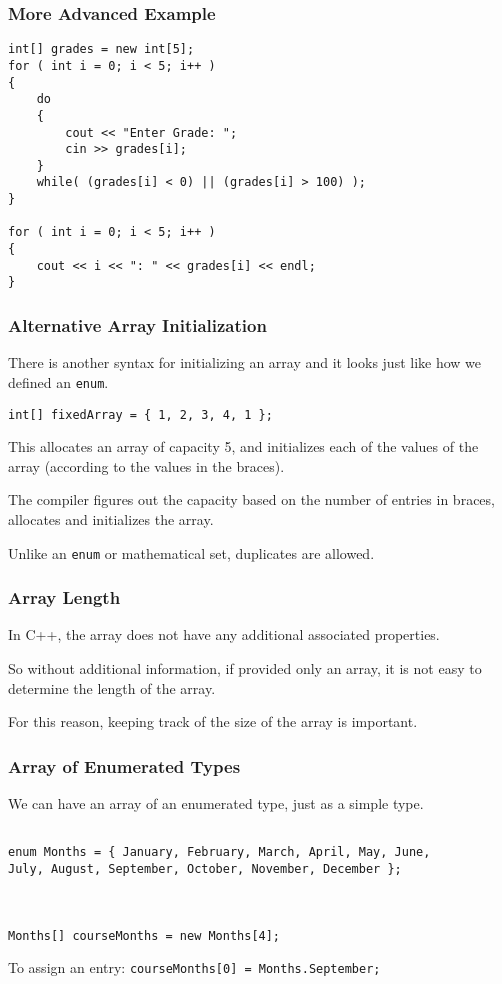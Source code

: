 \begin{frame}[fragile]
\frametitle{More Advanced Example}

{\small
\begin{verbatim}
int[] grades = new int[5];
for ( int i = 0; i < 5; i++ )
{
    do
    {
        cout << "Enter Grade: ";
        cin >> grades[i];
    }
    while( (grades[i] < 0) || (grades[i] > 100) );
}

for ( int i = 0; i < 5; i++ )
{
    cout << i << ": " << grades[i] << endl;
}
\end{verbatim}
}
\end{frame}

\begin{frame}
\frametitle{Alternative Array Initialization}

There is another syntax for initializing an array and it looks just like how we defined an \texttt{enum}.

\texttt{int[] fixedArray = \{ 1, 2, 3, 4, 1 \};}

This allocates an array of capacity 5, and initializes each of the values of the array (according to the values in the braces).

The compiler figures out the capacity based on the number of entries in braces, allocates and initializes the array.

Unlike an \texttt{enum} or mathematical set, duplicates are allowed.

\end{frame}



\begin{frame}
\frametitle{Array Length}

In C++, the array does not have any additional associated properties.

So without additional information, if provided only an array, it is not easy to determine the length of the array.

For this reason, keeping track of the size of the array is important.

\end{frame}



\begin{frame}[fragile]
\frametitle{Array of Enumerated Types}

We can have an array of an enumerated type, just as a simple type.

\begin{verbatim}

enum Months = { January, February, March, April, May, June, 
July, August, September, October, November, December };



Months[] courseMonths = new Months[4];

\end{verbatim}

To assign an entry: \texttt{courseMonths[0] = Months.September;}

\end{frame}


